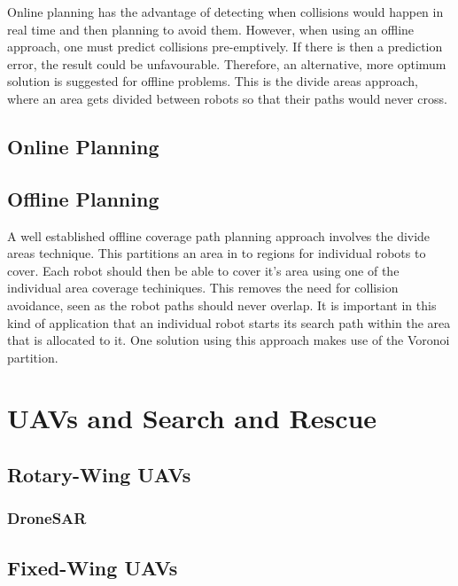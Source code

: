 Online planning has the advantage of detecting when collisions would happen in real time and then planning to avoid them. However, when using an offline approach, one must predict collisions pre-emptively. If there is then a prediction error, the result could be unfavourable. Therefore, an alternative, more optimum solution is suggested for offline problems. This is the divide areas approach, where an area gets divided between robots so that their paths would never cross.
\subsection{Online Planning}

\subsection{Offline Planning}
A well established offline coverage path planning approach involves the divide areas technique. This partitions an area in to regions for individual robots to cover. Each robot should then be able to cover it's area using one of the individual area coverage techiniques. This removes the need for collision avoidance, seen as the robot paths should never overlap. It is important in this kind of application that an individual robot starts its search path within the area that is allocated to it.
One solution using this approach makes use of the Voronoi partition.
\section{UAVs and Search and Rescue}
\subsection{Rotary-Wing UAVs}
\subsubsection{DroneSAR}
\subsection{Fixed-Wing UAVs}



